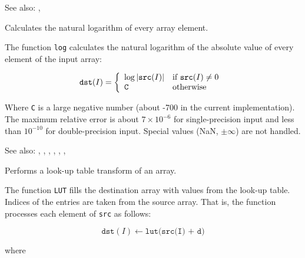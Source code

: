 See also: , 


Calculates the natural logarithm of every array element.

\begin{description}
\end{description}

The function \texttt{log} calculates the natural logarithm of the absolute value of every element of the input array:

\[
\texttt{dst}(I) = \left\{ \begin{array}{l l} \log |\texttt{src}(I)| & \mbox{if $\texttt{src}(I) \ne 0$ }\\ \texttt{C} & \mbox{otherwise}\\ \end{array} \right.
\]

Where \texttt{C} is a large negative number (about -700 in the current implementation).
The maximum relative error is about $7 \times 10^{-6}$ for single-precision input and less than $10^{-10}$ for double-precision input. Special values (NaN, $\pm \infty$) are not handled.

See also: , , , , , , 


Performs a look-up table transform of an array.

\begin{description}
\end{description}

The function \texttt{LUT} fills the destination array with values from the look-up table. Indices of the entries are taken from the source array. That is, the function processes each element of \texttt{src} as follows:

\[
\texttt{dst}(I) \leftarrow \texttt{lut(src(I) + d)}
\]

where

